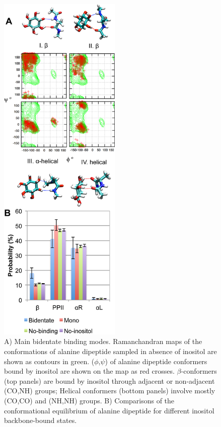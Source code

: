 	\begin{figure}[ht]
    \centering
    \includegraphics[width=220px]{figures/results1/GA4_paper_figures_submitted-2}
    \caption[Binding of scyllo-inositol to the backbone of alanine dipeptide.]
     {A) Main bidentate binding modes. Ramanchandran maps of the conformations of alanine dipeptide sampled in absence of inositol are shown as contours in green. ($\phi$,$\psi$) of alanine dipeptide conformers bound by inositol are shown on the map as red crosses. $\beta$-conformers (top panels) are bound by inositol through adjacent or non-adjacent (CO,NH) groups; Helical conformers (bottom panels) involve mostly (CO,CO) and (NH,NH) groups. B) Comparisons of the conformational equilibrium of alanine dipeptide for different inositol backbone-bound states.}
     \label{fig:figure2}
  \end{figure}
  
